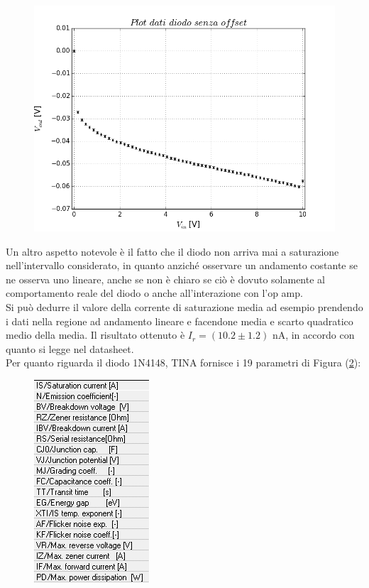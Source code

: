 \documentclass[journal, a4paper]{IEEEtran}
\begin{document}
\begin{figure}[htp]
\caption{}
\label{plotdiodo_no_offset}
\centering
\includegraphics[scale=.35]{plotdiodo_no_offset}
\end{figure}

Un altro aspetto notevole è il fatto che il diodo non arriva mai a saturazione nell'intervallo considerato, in quanto anziché osservare un andamento costante se ne osserva uno lineare, anche se non è chiaro se ciò è dovuto solamente al comportamento reale del diodo o anche all'interazione con l'op amp.\\
Si può dedurre il valore della corrente di saturazione media ad esempio prendendo i dati nella regione ad andamento lineare e facendone media e scarto quadratico medio della media. Il risultato ottenuto è $I_r = (10.2 \pm 1.2)$ nA, in accordo con quanto si legge nel datasheet.\\

Per quanto riguarda il diodo 1N4148, TINA fornisce i 19 parametri di Figura (\ref{dati_Tina}):\\

\begin{figure}[htp]
\caption{}
\label{dati_Tina}
\centering
\includegraphics[scale=.7]{dati_Tina}
\end{figure}
\end{document}
